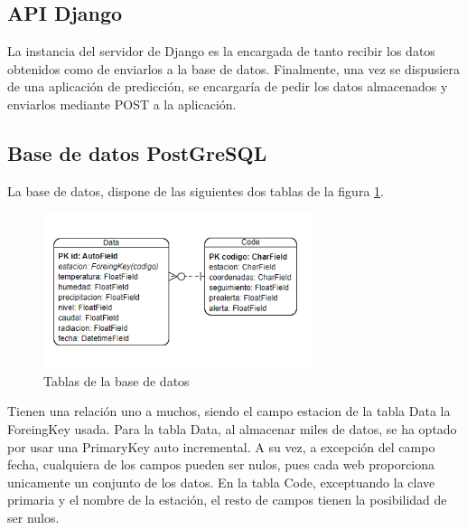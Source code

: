\subsection{API Django}
La instancia del servidor de Django es la encargada de tanto recibir los datos obtenidos como de enviarlos a la base de datos. Finalmente, una vez se dispusiera de una aplicación de predicción, se encargaría de pedir los datos almacenados y enviarlos mediante POST a la aplicación.

\subsection{Base de datos PostGreSQL}
La base de datos, dispone de las siguientes dos tablas de la figura \ref{fig:ej33}.

\begin{figure} [H]
	\centering
	\includegraphics[width=0.7\textwidth]{fig/TablasBBDD.png}
	\caption[Tablas de la base de datos]{Tablas de la base de datos}
	\label{fig:ej33}
\end{figure}

Tienen una relación uno a muchos, siendo el campo estacion de la tabla Data la ForeingKey usada.\newline
\newline
Para la tabla Data, al almacenar miles de datos, se ha optado por usar una PrimaryKey auto incremental. A su vez, a excepción del campo fecha, cualquiera de los campos pueden ser nulos, pues cada web proporciona unicamente un conjunto de los datos.\newline
\newline
En la tabla Code, exceptuando la clave primaria y el nombre de la estación, el resto de campos tienen la posibilidad de ser nulos.
